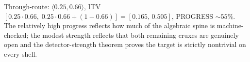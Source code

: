 \noindent Through-route: $\langle 0.25, 0.66\rangle$, ITV
$[0.25\cdot 0.66,\;0.25\cdot 0.66+(1-0.66)] = [0.165,\,0.505]$,
PROGRESS $\sim 55\%$. The relatively high progress reflects how much of the
algebraic spine is machine-checked; the modest strength reflects that both
remaining cruxes are genuinely open and the detector-strength theorem proves the
target is strictly nontrivial on every shell.
